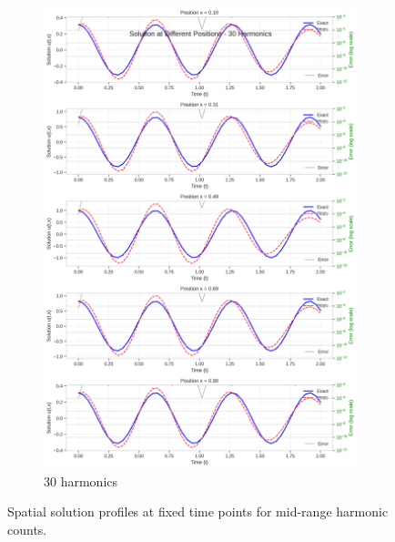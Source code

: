 \begin{figure}[H]
\begin{subfigure}[b]{0.32\textwidth}
        \includegraphics[width=\textwidth]{figures/space_slices_30h.png}
        \caption{30 harmonics}
    \end{subfigure}
    \caption{Spatial solution profiles at fixed time points for mid-range harmonic counts.}
    \label{fig:space_slices_mid}
\end{figure}

